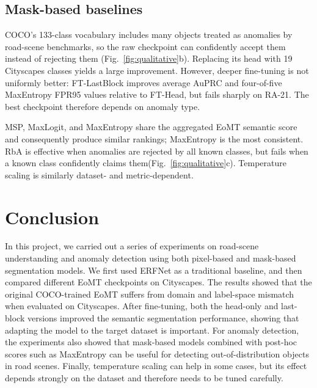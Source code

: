 \documentclass[10pt,twocolumn,letterpaper]{article}
\begin{document}
\subsection{Mask-based baselines}
COCO's 133-class vocabulary includes many objects treated as anomalies by road-scene benchmarks, so the raw checkpoint can confidently accept them instead of rejecting them (Fig.~\ref{fig:qualitative}b). Replacing its head with 19 Cityscapes classes yields a large improvement. However, deeper fine-tuning is not uniformly better: FT-LastBlock improves average AuPRC and four-of-five MaxEntropy FPR95 values relative to FT-Head, but fails sharply on RA-21. The best checkpoint therefore depends on anomaly type.

MSP, MaxLogit, and MaxEntropy share the aggregated EoMT semantic score and consequently produce similar rankings; MaxEntropy is the most consistent. RbA is effective when anomalies are rejected by all known classes, but fails when a known class confidently claims them(Fig.~\ref{fig:qualitative}c). Temperature scaling is similarly dataset- and metric-dependent.

\section{Conclusion}

In this project, we carried out a series of experiments on road-scene understanding and anomaly detection using both pixel-based and mask-based segmentation models. We first used ERFNet as a traditional baseline, and then compared different EoMT checkpoints on Cityscapes. The results showed that the original COCO-trained EoMT suffers from domain and label-space mismatch when evaluated on Cityscapes. After fine-tuning, both the head-only and last-block versions improved the semantic segmentation performance, showing that adapting the model to the target dataset is important. For anomaly detection, the experiments also showed that mask-based models combined with post-hoc scores such as MaxEntropy can be useful for detecting out-of-distribution objects in road scenes. Finally, temperature scaling can help in some cases, but its effect depends strongly on the dataset and therefore needs to be tuned carefully.
\end{document}
